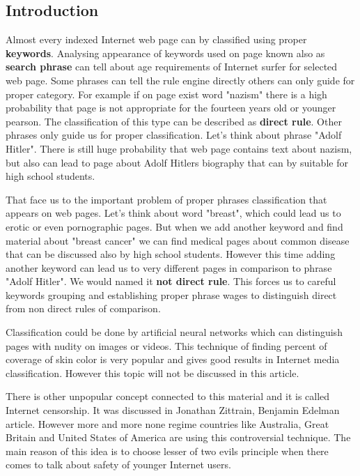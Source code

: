 \documentclass[9pt,a4paper]{extarticle}
\begin{document}
\begin{multicols}{2}
\section{Introduction}
Almost every indexed Internet web page can by classified using proper \textbf{keywords}. Analysing appearance of keywords used on page known also as \textbf{search phrase} can tell about age requirements of Internet surfer for selected web page. Some phrases can tell the rule engine directly others can only guide for proper category. For example if on page exist word "nazism" there is a high probability that page is not appropriate for the fourteen years old or younger pearson. The classification of this type can be described as \textbf{direct rule}. Other phrases only guide us for proper classification. Let's think about phrase "Adolf Hitler". There is still huge probability that web page contains text about nazism, but also can lead to page about Adolf Hitlers biography that can by suitable for high school students.

That face us to the important problem of proper phrases classification that appears on web pages. Let's think about word "breast", which could lead us to erotic or even pornographic pages. But when we add another keyword and find material about "breast cancer" we can find medical pages about common disease that can be discussed also by high school students. However this time adding another keyword can lead us to very different pages in comparison to phrase "Adolf Hitler". We would named it \textbf{not direct rule}. This forces us to careful keywords grouping and establishing proper phrase wages to distinguish direct from non direct rules of comparison.

Classification could be done by artificial neural networks which can distinguish pages with nudity on images or videos\cite{will_archer_arentz_classifying_nodate, radhouane_guermazi_combining_2007, giuseppe_amato_detection_2009}. This technique of finding percent of coverage of skin color is very popular and gives good results in Internet media classification\cite{mohammad_reza_mahmoodi_high_nodate}. However this topic will not be discussed in this article.

There is other unpopular concept connected to this material and it is called Internet censorship. It was discussed in Jonathan Zittrain, Benjamin Edelman article\cite{jonathan_zittrain_internet_2003}. However more and more none regime countries like Australia, Great Britain and United States of America are using this controversial technique. The main reason of this idea is to choose lesser of two evils principle when there comes to talk about safety of younger Internet users\cite{piotr_luczuk_cyberwojna_2016}.


\end{multicols}
\end{document}
